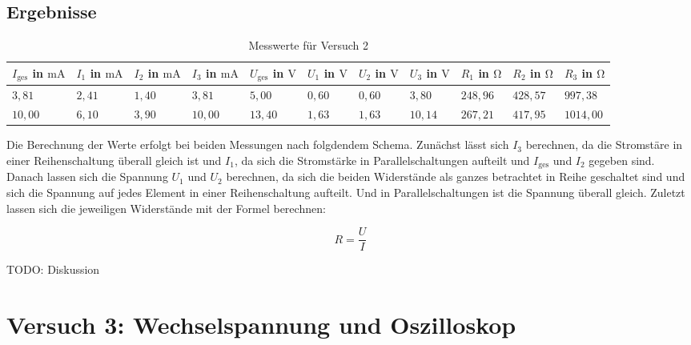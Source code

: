     \subsection{Ergebnisse}

        \begin{table}[h!]
            \centering
            \begin{tabular}{|l|l|l|l|l|l|l|l|l|l|l|}
                \hline
                $I_{\mathrm{ges}}$ in $\mathrm{mA}$ & $I_{1}$ in $\mathrm{mA}$ & $I_{2}$ in $\mathrm{mA}$ & $I_{3}$ in $\mathrm{mA}$ & $U_{\mathrm{ges}}$ in $\mathrm{V}$ & $U_{1}$ in $\mathrm{V}$ & $U_{2}$ in $\mathrm{V}$ & $U_{3}$ in $\mathrm{V}$ & $R_{1}$ in $\mathrm{\Omega}$ & $R_{2}$ in $\mathrm{\Omega}$ & $R_{3}$ in $\mathrm{\Omega}$\\
                \hline\hline
                $3,81$ & $2,41$ & $1,40$ & $3,81$ & $5,00$ & $0,60$ & $0,60$ & $3,80$ & $248,96$ & $428,57$ & $997,38$\\
                \hline
                $10,00$ & $6,10$ & $3,90$ & $10,00$ & $13,40$ & $1,63$ & $1,63$ & $10,14$ & $267,21$ & $417,95$ & $1014,00$\\
                \hline
            \end{tabular}
            \caption{Messwerte für Versuch 2}
            \label{tab:versuch2}
        \end{table}

        Die Berechnung der Werte erfolgt bei beiden Messungen nach folgdendem Schema. Zunächst lässt sich $I_{3}$ berechnen, da die Stromstäre in einer Reihenschaltung überall gleich ist und $I_{1}$, da sich die Stromstärke in Parallelschaltungen aufteilt und $I_{\mathrm{ges}}$ und $I_{2}$ gegeben sind.
        Danach lassen sich die Spannung $U_{1}$ und $U_{2}$ berechnen, da sich die beiden Widerstände als ganzes betrachtet in Reihe geschaltet sind und sich die Spannung auf jedes Element in einer Reihenschaltung aufteilt. Und in Parallelschaltungen ist die Spannung überall gleich.
        Zuletzt lassen sich die jeweiligen Widerstände mit der Formel berechnen:

        \begin{equation}
            R = \frac{U}{I}
        \end{equation}

        TODO: Diskussion

\section{Versuch 3: Wechselspannung und Oszilloskop}

